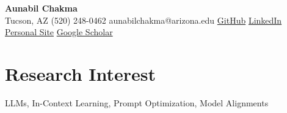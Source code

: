\documentclass[10pt]{extarticle}
\begin{document}
\vspace{-1em}
\begin{center}
    {\LARGE \textbf{Aunabil Chakma}}\\
    Tucson, AZ \;\textbullet\; (520) 248-0462 \;\textbullet\; aunabilchakma@arizona.edu \;\textbullet\;
    \href{https://github.com/Aunabil4602}{GitHub} \;\textbullet\;
    \href{https://www.linkedin.com/in/aunabil-chakma-56052119b/}{LinkedIn} \;\textbullet\;
    \href{https://aunabil4602.github.io/}{Personal Site} \;\textbullet\;
    \href{https://scholar.google.com/citations?hl=en&user=LQepJpUAAAAJ&view_op=list_works&sortby=pubdate}{Google Scholar}
\end{center}

\vspace{-1em}

\section*{Research Interest}
LLMs, In-Context Learning, Prompt Optimization, Model Alignments






\end{document}
